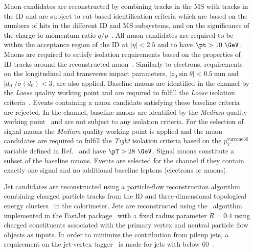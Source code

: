 Muon candidates are reconstructed by combining tracks in the MS with tracks in the ID and are subject to cut-based identification criteria which are based on the numbers of hits in the different ID and MS subsystems, and on the significance of the charge-to-momentum ratio $q/p$~\cite{MUON-2018-03}. All muon candidates are required to be within the acceptance region of the ID at $|\eta| < 2.5$ and to have $\pt>10~\GeV$. Muons are required to satisfy isolation requirements based on the properties of ID tracks around the reconstructed muon~\cite{MUON-2018-03}. Similarly to electrons, requirements on the longitudinal and transverse impact parameters, $|z_0\sin\theta|<0.5~$mm and $|d_0|/\sigma(d_0)<3$, are also applied.
Baseline muons are identified in the \allhad channel by the \emph{Loose} quality working point and are required to fulfill the \emph{Loose} isolation criteria~\cite{MUON-2018-03}. Events containing a muon candidate satisfying these baseline criteria are rejected. In the \onelep channel, baseline muons are identified by the \emph{Medium} quality working point~\cite{MUON-2018-03} and are not subject to any isolation criteria. 
For the selection of signal muons the \emph{Medium} quality working point is applied and the muon candidates are required to fulfill the \emph{Tight} isolation criteria based on the $p_T^{\text{varcone30}}$ variable defined in Ref.~\cite{MUON-2018-03} and have $\pT>28~\GeV$. Signal muons constitute a subset of the baseline muons. Events are selected for the \onelep channel if they contain exactly one signal and no additional baseline leptons (electrons or muons).

Jet candidates are reconstructed using a particle-flow reconstruction algorithm~\cite{PERF-2015-09} combining charged particle tracks from the ID and three-dimensional topological energy clusters~\cite{PERF-2014-07} in the calorimeter. %
Jets are reconstructed using the \antikt\ algorithm~\cite{Cacciari:2008gp} implemented in the FastJet package~\cite{Fastjet} with a fixed radius parameter $R=0.4$ using charged constituents associated with the primary vertex and neutral particle flow objects as inputs. 
 In order to minimize the contribution from pileup jets, a requirement on the jet-vertex tagger~\cite{PERF-2014-03} is made for jets with \pt below 60~\GeV.  

